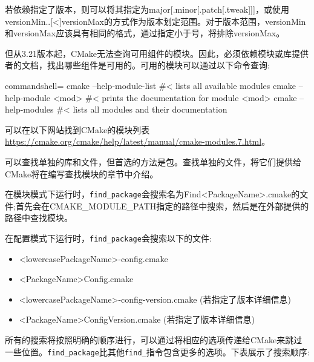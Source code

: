 若依赖指定了版本，则可以将其指定为major[.minor[.patch[.tweak]]]，或使用versionMin..[<]versionMax的方式作为版本划定范围。对于版本范围，versionMin和versionMax应该具有相同的格式，通过指定小于号，将排除versionMax。

但从3.21版本起，CMake无法查询可用组件的模块。因此，必须依赖模块或库提供者的文档，找出哪些组件是可用的。可用的模块可以通过以下命令查询:

\begin{tcblisting}{commandshell={}}
cmake --help-module-list #< lists all available modules
cmake --help-module <mod> #< prints the documentation for
  module <mod>
cmake --help-modules #< lists all modules and their
  documentation
\end{tcblisting}

可以在以下网站找到CMake的模块列表\url{https://cmake.org/cmake/help/latest/manual/cmake-modules.7.html}。

\begin{tcolorbox}[colback=blue!5!white,colframe=blue!75!black,title=查找单个库和文件]
可以查找单独的库和文件，但首选的方法是包。查找单独的文件，将它们提供给CMake将在编写查找模块的章节中介绍。
\end{tcolorbox}

在模块模式下运行时，\texttt{find\_package}会搜索名为Find<PackageName>.cmake的文件;首先会在CMAKE\_MODULE\_PATH指定的路径中搜索，然后是在外部提供的路径中查找模块。

在配置模式下运行时，\texttt{find\_package}会搜索以下的文件:

\begin{itemize}
\item 
<lowercasePackageName>-config.cmake

\item 
<PackageName>Config.cmake

\item 
<lowercasePackageName>-config-version.cmake (若指定了版本详细信息)

\item 
<PackageName>ConfigVersion.cmake (若指定了版本详细信息)
\end{itemize}

所有的搜索将按照明确的顺序进行，可以通过将相应的选项传递给CMake来跳过一些位置。\texttt{find\_package}比其他\texttt{find\_}指令包含更多的选项。下表展示了搜索顺序:

